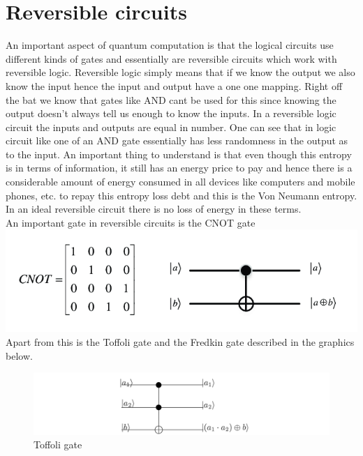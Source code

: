 \documentclass{report}
\begin{document}
\section{Reversible circuits}
An important aspect of quantum computation is that the logical circuits use different kinds of gates and essentially are reversible circuits which work with reversible logic. 
Reversible logic simply means that if we know the output we also know the input hence the input and output have a one one mapping. Right off the bat we know that gates like AND cant be used for this since knowing the output doesn't always tell us enough to know the inputs. 
In a reversible logic circuit the inputs and outputs are equal in number. One can see that in logic circuit like one of an AND gate essentially has less randomness in the output as to the input. 
An important thing to understand is that even though this entropy is in terms of information, it still has an energy price to pay and hence there is a considerable amount of energy consumed in all devices like computers and mobile phones, etc. to repay this entropy loss debt and this is the Von Neumann entropy. In an ideal reversible circuit there is no loss of energy in these terms.\\
An important gate in reversible circuits is the CNOT gate\\
\includegraphics[width = \textwidth]{images/CNOT.png}
Apart from this is the Toffoli gate and the Fredkin gate described in the graphics below.
\begin{figure}[ht]
    \centering
    \includegraphics[width = \textwidth]{images/toffoli.png}
    \captionsetup{labelformat = empty}
    \caption{Toffoli gate}
\end{figure}\\
\end{document}
